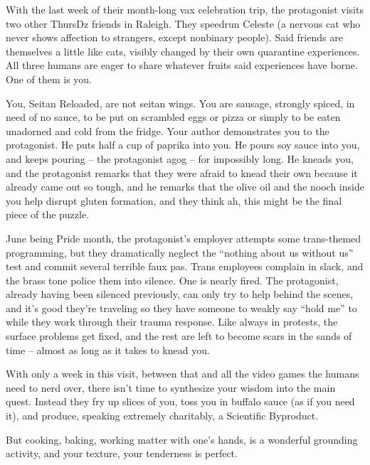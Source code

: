 \documentclass[12pt]{article}
\begin{document}
With the last week of their month-long vax celebration trip,
the protagonist visits two other ThursDz friends in Raleigh.
They speedrun Celeste (a nervous cat who never shows affection to strangers, except nonbinary people).
Said friends are themselves a little like cats, visibly changed by their own quarantine experiences.
All three humans are eager to share whatever fruits said experiences have borne.
One of them is you.

You, Seitan Reloaded, are not seitan wings.
You are sausage, strongly spiced, in need of no sauce,
to be put on scrambled eggs or pizza or simply to be eaten unadorned and cold from the fridge.
Your author demonstrates you to the protagonist.
He puts half a cup of paprika into you.
He pours soy sauce into you, and keeps pouring -- the protagonist agog -- for impossibly long.
He kneads you,
and the protagonist remarks that they were afraid to knead their own because it already came out so tough,
and he remarks that the olive oil and the nooch inside you help disrupt gluten formation,
and they think ah, this might be the final piece of the puzzle.

June being Pride month,
the protagonist's employer attempts some trans-themed programming,
but they dramatically neglect the ``nothing about us without us'' test
and commit several terrible faux pas.
Trans employees complain in slack,
and the brass tone police them into silence.
One is nearly fired.
The protagonist, already having been silenced previously,
can only try to help behind the scenes,
and it's good they're traveling so they have someone to weakly say ``hold me'' to
while they work through their trauma response.
Like always in protests, the surface problems get fixed, and the rest are left to become scars in the sands of time -- almost as long as it takes to knead you.

With only a week in this visit, between that and all the video games the humans need to nerd over, there isn't time to synthesize your wisdom into the main quest.
Instead they fry up slices of you, toss you in buffalo sauce (as if you need it),
and produce, speaking extremely charitably, a Scientific Byproduct.

But cooking, baking, working matter with one's hands, is a wonderful grounding activity,
and your texture, your tenderness is perfect.

\end{document}
